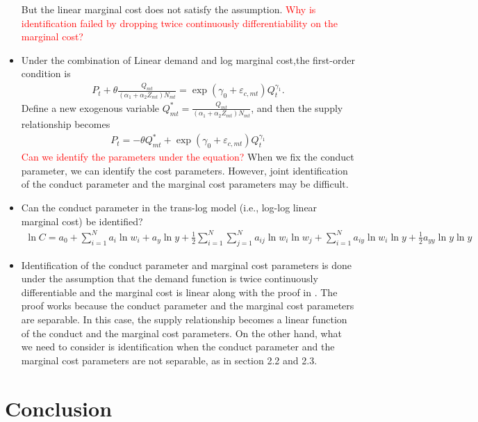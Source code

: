 \documentclass[11pt, a4paper]{article}
\begin{document}
\begin{itemize}
        But the linear marginal cost does not satisfy the assumption. \textcolor{red}{Why is identification failed by dropping twice continuously differentiability on the marginal cost?}
        \item Under the combination of Linear demand and log marginal cost,the first-order condition is 
        \begin{align*}
            P_t +\theta\frac{Q_{mt}}{(\alpha_1 + \alpha_2 Z_{mt})N_{mt}} = \exp(\gamma_0 + \varepsilon_{c,mt})Q_t^{\gamma_1}.
        \end{align*}
        Define a new exogenous variable $Q^*_{mt} = \frac{Q_{mt}}{(\alpha_1 + \alpha_2 Z_{mt})N_{mt}}$, and then the supply relationship becomes
        \begin{align*}
            P_t = -\theta Q^*_{mt}+ \exp(\gamma_0 + \varepsilon_{c,mt})Q_t^{\gamma_1}
        \end{align*}
        \textcolor{red}{Can we identify the parameters under the equation?} When we fix the conduct parameter, we can identify the cost parameters. However, joint identification of the conduct parameter and the marginal cost parameters may be difficult.
        \item Can the conduct parameter in the trans-log model (i.e., log-log linear marginal cost) be identified?
        \begin{align*}
            \ln C=a_0+\sum_{i=1}^N a_i \ln w_i+a_y \ln y+\frac{1}{2} \sum_{i=1}^N \sum_{j=1}^N a_{i j} \ln w_i \ln w_j+\sum_{i=1}^N a_{i y} \ln w_i \ln y+\frac{1}{2} a_{y y} \ln y \ln y
        \end{align*}
        \item Identification of the conduct parameter and marginal cost parameters is done under the assumption that the demand function is twice continuously differentiable and the marginal cost is linear along with the proof in \citet{lau1982identifying}. The proof works because the conduct parameter and the marginal cost parameters are separable. In this case, the supply relationship becomes a linear function of the conduct and the marginal cost parameters. On the other hand, what we need to consider is identification when the conduct parameter and the marginal cost parameters are not separable, as in section 2.2 and 2.3.
    \end{itemize}
    
\section{Conclusion}
\end{document}
